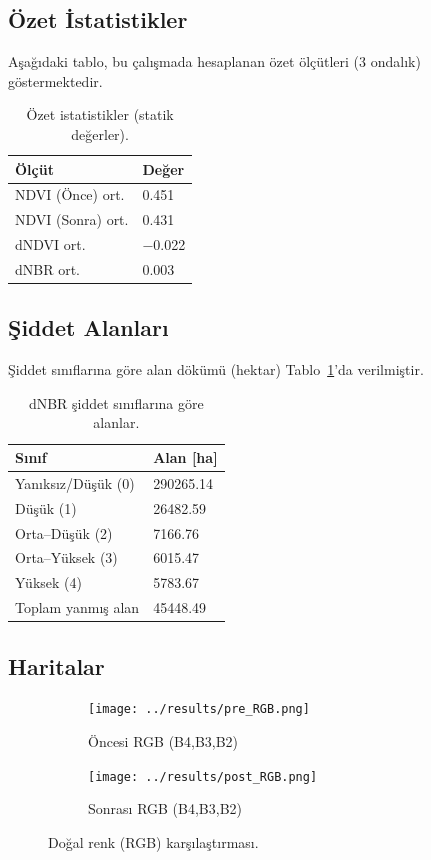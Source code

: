\documentclass[11pt,a4paper]{article}
\begin{document}
\subsection{Özet İstatistikler}
Aşağıdaki tablo, bu çalışmada hesaplanan özet ölçütleri (3 ondalık) göstermektedir.
\begin{table}[H]
  \centering
  \begin{tabular}{@{}ll@{}}
  \toprule
  Ölçüt & Değer \\
  \midrule
  NDVI (Önce) ort. & \num{0.451} \\
  NDVI (Sonra) ort. & \num{0.431} \\
  dNDVI ort. & \num{-0.022} \\
  dNBR ort. & \num{0.003} \\
  \bottomrule
  \end{tabular}
  \caption{Özet istatistikler (statik değerler).}
\end{table}

\subsection{Şiddet Alanları}
Şiddet sınıflarına göre alan dökümü (hektar) Tablo~\ref{tab:areas}'da verilmiştir.
\begin{table}[H]
  \centering
  \begin{tabular}{@{}ll@{}}
  \toprule
  Sınıf & Alan [ha] \\
  \midrule
  Yanıksız/Düşük (0) & \num{290265.14} \\
  Düşük (1) & \num{26482.59} \\
  Orta--Düşük (2) & \num{7166.76} \\
  Orta--Yüksek (3) & \num{6015.47} \\
  Yüksek (4) & \num{5783.67} \\
  Toplam yanmış alan & \num{45448.49} \\
  \bottomrule
  \end{tabular}
  \caption{dNBR şiddet sınıflarına göre alanlar.}
  \label{tab:areas}
\end{table}

\subsection{Haritalar}
\begin{figure}[H]
  \centering
  \begin{subfigure}[b]{0.48\textwidth}
    \centering
    \texttt{[image: ../results/pre\_RGB.png]}
    \caption{Öncesi RGB (B4,B3,B2)}
  \end{subfigure}\hfill
  \begin{subfigure}[b]{0.48\textwidth}
    \centering
    \texttt{[image: ../results/post\_RGB.png]}
    \caption{Sonrası RGB (B4,B3,B2)}
  \end{subfigure}
  \caption{Doğal renk (RGB) karşılaştırması.}
  \label{fig:rgb}
\end{figure}
\FloatBarrier
\end{document}
